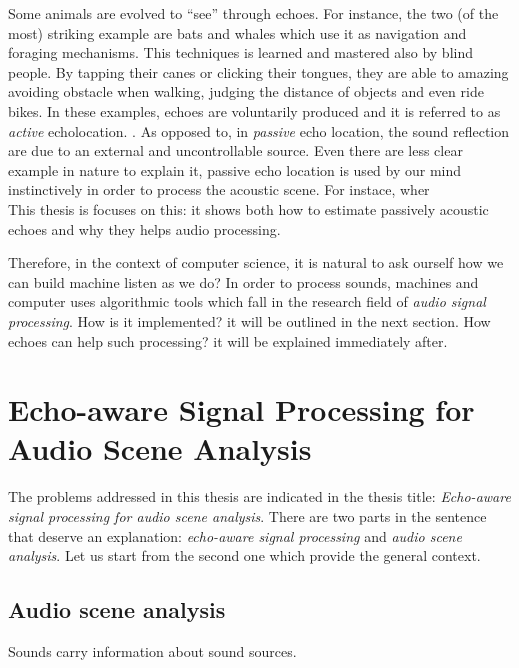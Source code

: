 \mynewline
Some animals are evolved to ``see'' through echoes.
For instance, the two (of the most) striking example are bats and whales which use it as navigation and foraging mechanisms.
This techniques is learned and mastered also by blind people.
By tapping their canes or clicking their tongues, they are able to amazing avoiding obstacle when walking, judging the distance of objects and even ride bikes.
In these examples, echoes are voluntarily produced and it is referred to as \textit{active} echolocation.
.
As opposed to, in \textit{passive} echo location, the sound reflection are due to an external and uncontrollable source.
Even there are less clear example in nature to explain it, passive echo location is used by our mind instinctively in order to process the acoustic scene.
For instace, wher
\\This thesis is focuses on this: it shows both how to estimate passively acoustic echoes and why they helps audio processing.

\mynewline
Therefore, in the context of computer science, it is natural to ask ourself how we can build machine listen as we do?
In order to process sounds, machines and computer uses algorithmic tools which fall in the research field of \textit{audio signal processing}.
How is it implemented? it will be outlined in the next section.
How echoes can help such processing? it will be explained immediately after.

\section{Echo-aware Signal Processing for Audio Scene Analysis}\label{sec:intro:problem}
The problems addressed in this thesis are indicated in the thesis title: \textit{Echo-aware signal processing for audio scene analysis}.
There are two parts in the sentence that deserve an explanation: \textit{echo-aware signal processing} and \textit{audio scene analysis}.
Let us start from the second one which provide the general context.

\subsection{Audio scene analysis}
Sounds carry information about sound sources.


